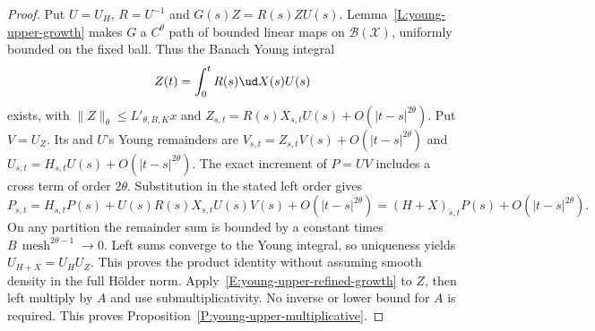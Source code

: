 \begin{proof}
  Put $U=U_H$, $R=U^{-1}$ and $G(s)Z=R(s)ZU(s)$.
  Lemma~\ref{L:young-upper-growth} makes $G$ a $C^\theta$ path
  of bounded linear maps on $\mathcal B(\mathcal X)$, uniformly
  bounded on the fixed ball. Thus the Banach Young integral
  \[
    Z(t)=\int_0^tR(s)\ud X(s)U(s)
  \]
  exists, with $\|Z\|_\theta\le L'_{\theta,B,K}x$ and
  $Z_{s,t}=R(s)X_{s,t}U(s)+O(|t-s|^{2\theta})$.
  Put $V=U_Z$. Its and $U$'s Young remainders are
  $V_{s,t}=Z_{s,t}V(s)+O(|t-s|^{2\theta})$ and
  $U_{s,t}=H_{s,t}U(s)+O(|t-s|^{2\theta})$.
  The exact increment of $P=UV$ includes a cross term of order
  $2\theta$. Substitution in the stated left order gives
  \[
    P_{s,t}
    =H_{s,t}P(s)+U(s)R(s)X_{s,t}U(s)V(s)
    +O(|t-s|^{2\theta})
    =(H+X)_{s,t}P(s)+O(|t-s|^{2\theta}).
  \]
  On any partition the remainder sum is bounded by a constant
  times $B\,\operatorname{mesh}^{2\theta-1}\to0$.
  Left sums converge to the Young integral, so uniqueness yields
  $U_{H+X}=U_HU_Z$. This proves the product identity without
  assuming smooth density in the full H\"older norm.
  Apply~\eqref{E:young-upper-refined-growth} to $Z$, then left
  multiply by $A$ and use submultiplicativity.
  No inverse or lower bound for $A$ is required.
  This proves Proposition~\ref{P:young-upper-multiplicative}.
\end{proof}
